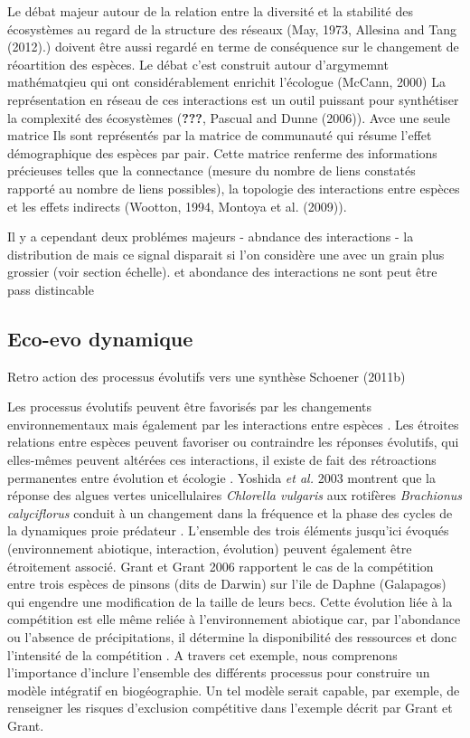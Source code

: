 Le débat majeur autour de la relation entre la diversité et la stabilité
des écosystèmes au regard de la structure des réseaux (May, 1973,
Allesina and Tang (2012).) doivent être aussi regardé en terme de
conséquence sur le changement de réoartition des espèces. Le débat c'est
construit autour d'argymemnt mathématqieu qui ont considérablement
enrichit l'écologue (McCann, 2000) La représentation en réseau de ces
interactions est un outil puissant pour synthétiser la complexité des
écosystèmes ({\textbf{???}}, Pascual and Dunne (2006)). Avce une seule
matrice Ils sont représentés par la matrice de communauté qui résume
l'effet démographique des espèces par pair. Cette matrice renferme des
informations précieuses telles que la connectance (mesure du nombre de
liens constatés rapporté au nombre de liens possibles), la topologie des
interactions entre espèces \cite{Sole2006} et les effets indirects
(Wootton, 1994, Montoya et al. (2009)).

Il y a cependant deux problémes majeurs - abndance des interactions - la
distribution de mais ce signal disparait si l'on considère une avec un
grain plus grossier (voir section échelle). et abondance des
interactions ne sont peut être pass distincable

\subsection*{Eco-evo dynamique}\label{eco-evo-dynamique}

Retro action des processus évolutifs vers une synthèse Schoener (2011b)

Les processus évolutifs peuvent être favorisés par les changements
environnementaux mais également par les interactions entre espèces
\cite{Tingley2009}. Les étroites relations entre espèces peuvent
favoriser ou contraindre les réponses évolutifs, qui elles-mêmes peuvent
altérées ces interactions, il existe de fait des rétroactions
permanentes entre évolution et écologie \cite{Post2009}. Yoshida
\textit{et al.} 2003 montrent que la réponse des algues vertes
unicellulaires \textit{Chlorella vulgaris} aux rotifères
\textit{Brachionus calyciflorus} conduit à un changement dans la
fréquence et la phase des cycles de la dynamiques proie prédateur
\cite{Yoshida2003}. L'ensemble des trois éléments jusqu'ici évoqués
(environnement abiotique, interaction, évolution) peuvent également être
étroitement associé. Grant et Grant 2006 rapportent le cas de la
compétition entre trois espèces de pinsons (dits de Darwin) sur l'ile de
Daphne (Galapagos) qui engendre une modification de la taille de leurs
becs. Cette évolution liée à la compétition est elle même reliée à
l'environnement abiotique car, par l'abondance ou l'absence de
précipitations, il détermine la disponibilité des ressources et donc
l'intensité de la compétition \cite{Grant2006}. A travers cet exemple,
nous comprenons l'importance d'inclure l'ensemble des différents
processus pour construire un modèle intégratif en biogéographie. Un tel
modèle serait capable, par exemple, de renseigner les risques
d'exclusion compétitive dans l'exemple décrit par Grant et Grant.

